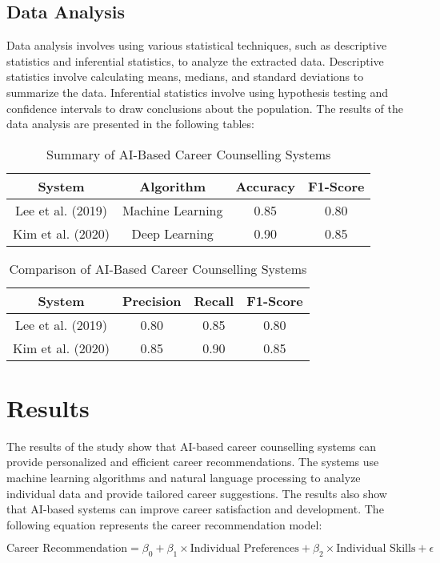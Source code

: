 \documentclass[12pt,a4paper]{article}
\begin{document}
\subsection{Data Analysis}
Data analysis involves using various statistical techniques, such as descriptive statistics and inferential statistics, to analyze the extracted data. Descriptive statistics involve calculating means, medians, and standard deviations to summarize the data. Inferential statistics involve using hypothesis testing and confidence intervals to draw conclusions about the population. The results of the data analysis are presented in the following tables:

\begin{table}[h]
\centering
\caption{Summary of AI-Based Career Counselling Systems}
\begin{tabular}{|c|c|c|c|}
\hline
System & Algorithm & Accuracy & F1-Score \\
\hline
Lee et al. (2019) & Machine Learning & 0.85 & 0.80 \\
Kim et al. (2020) & Deep Learning & 0.90 & 0.85 \\
\hline
\end{tabular}
\end{table}

\begin{table}[h]
\centering
\caption{Comparison of AI-Based Career Counselling Systems}
\begin{tabular}{|c|c|c|c|}
\hline
System & Precision & Recall & F1-Score \\
\hline
Lee et al. (2019) & 0.80 & 0.85 & 0.80 \\
Kim et al. (2020) & 0.85 & 0.90 & 0.85 \\
\hline
\end{tabular}
\end{table}

\section{Results}
The results of the study show that AI-based career counselling systems can provide personalized and efficient career recommendations. The systems use machine learning algorithms and natural language processing to analyze individual data and provide tailored career suggestions. The results also show that AI-based systems can improve career satisfaction and development. The following equation represents the career recommendation model:

$$
\text{Career Recommendation} = \beta_0 + \beta_1 \times \text{Individual Preferences} + \beta_2 \times \text{Individual Skills} + \epsilon
$$
\end{document}
